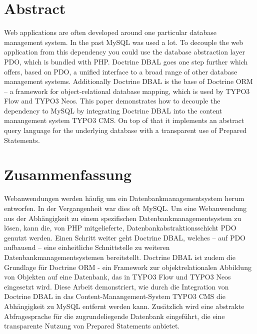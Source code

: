 \begingroup
\let\clearpage\relax
\let\cleardoublepage\relax
\let\cleardoublepage\relax

\chapter*{Abstract}
\label{ch:abstractEn}
Web applications are often developed around one particular database management system. In the past MySQL was used a lot. To decouple the web application from this dependency you could use the database abstraction layer PDO, which is bundled with PHP. Doctrine DBAL goes one step further which offers, based on PDO, a unified interface to a broad range of other database management systems. Additionally Doctrine DBAL is the base of Doctrine ORM – a framework for object-relational database mapping, which is used by TYPO3 Flow and TYPO3 Neos. This paper demonstrates how to decouple the dependency to MySQL by integrating Doctrine DBAL into the content manangement system TYPO3 CMS. On top of that it implements an abstract query language for the underlying database with a transparent use of Prepared Statements.

\vfill

\chapter{Zusammenfassung}
\label{ch:abstractDe}
Webanwendungen werden häufig um ein Datenbankmanagementsystem herum entworfen. In der Vergangenheit war dies oft MySQL. Um eine Webanwendung aus der Abhängigkeit zu einem spezifischen Datenbankmanagementsystem zu lösen, kann die, von PHP mitgelieferte, Datenbankabstraktionsschicht PDO genutzt werden. Einen Schritt weiter geht Doctrine DBAL, welches – auf PDO aufbauend – eine einheitliche Schnittstelle zu weiteren Datenbankmanagementsystemen bereitstellt. Doctrine DBAL ist zudem die Grundlage für Doctrine ORM - ein Framework zur objektrelationalen Abbildung von Objekten auf eine Datenbank, das in TYPO3 Flow und TYPO3 Neos eingesetzt wird. Diese Arbeit demonstriert, wie durch die Integration von Doctrine DBAL in das Content-Manangement-System TYPO3 CMS die Abhängigkeit zu MySQL entfernt werden kann. Zusätzlich wird eine abstrakte Abfragesprache für die zugrundeliegende Datenbank eingeführt, die eine transparente Nutzung von Prepared Statements anbietet.

\endgroup
\vfill
